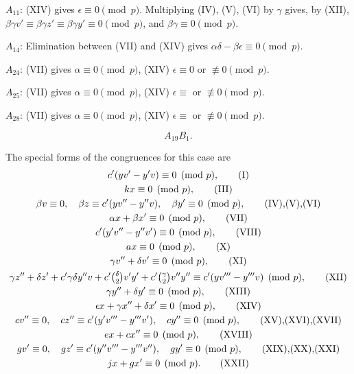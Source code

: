 \documentclass[oneside]{article}
\begin{document}
\smallskip
$A_{11}$: (XIV) gives $\epsilon \equiv 0 \pmod{p}$. Multiplying (IV), (V),
(VI) by $\gamma$ gives, by (XII), $\beta\gamma v' \equiv \beta\gamma z'
\equiv \beta\gamma y' \equiv 0 \pmod{p}$, and $\beta\gamma \equiv 0
\pmod{p}$.

\smallskip
$A_{14}$: Elimination between (VII) and (XIV) gives $\alpha\delta -
\beta\epsilon \equiv 0 \pmod{p}$.

\smallskip
$A_{24}$: (VII) gives $\alpha \equiv 0 \pmod{p}$, (XIV) $\epsilon \equiv 0$
or $\not\equiv 0 \pmod{p}$.

\smallskip
$A_{25}$: (VII) gives $\alpha \equiv 0 \pmod{p}$, (XIV) $\epsilon \equiv$
or $\not\equiv 0 \pmod{p}$.

\smallskip
$A_{28}$: (VII) gives $\alpha \equiv 0 \pmod{p}$, (XIV) $\epsilon \equiv$
or $\not\equiv 0 \pmod{p}$.

\newpage
\begin{equation*} A_{19} B_1. \end{equation*}

The special forms of the congruences for this case are
\begin{gather*}
c'(yv' - y'v) \equiv 0 \pmod{p}, \tag{I} \\
kx \equiv 0 \pmod{p}, \tag{III} \\
\beta v \equiv 0, \quad \beta z \equiv c'(yv'' - y''v), \quad \beta y'
\equiv 0 \pmod{p}, \tag*{(IV),(V),(VI)} \\
\alpha x + \beta x' \equiv 0 \pmod{p}, \tag{VII} \\
c'(y'v'' - y''v') \equiv 0 \pmod{p}, \tag{VIII} \\
ax \equiv 0 \pmod{p}, \tag{X} \\
\gamma v'' + \delta v' \equiv 0 \pmod{p}, \tag{XI} \\
\gamma z'' + \delta z' + c'\gamma\delta y''v + c'\tbinom{\delta}{2}v'y' +
c'\tbinom{\gamma}{2}v''y'' \equiv c'(yv''' - y'''v) \pmod {p}, \tag{XII} \\
\gamma y'' + \delta y' \equiv 0 \pmod{p}, \tag{XIII} \\
\epsilon x + \gamma x'' + \delta x' \equiv 0 \pmod{p}, \tag{XIV} \\
cv'' \equiv 0, \quad cz'' \equiv c'(y'v''' - y'''v'), \quad cy'' \equiv 0
  \pmod{p}, \tag*{(XV),(XVI),(XVII)} \\
ex + cx'' \equiv 0 \pmod{p}, \tag{XVIII} \\
gv' \equiv 0, \quad gz' \equiv c'(y''v''' - y'''v''), \quad gy' \equiv 0
  \pmod{p}, \tag*{(XIX),(XX),(XXI)} \\
jx + gx' \equiv 0 \pmod{p}. \tag{XXII} \\
\end{gather*}
\end{document}
